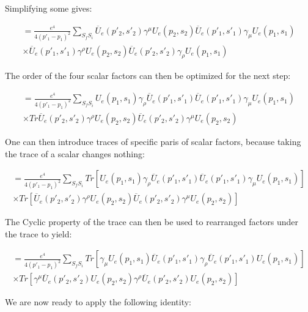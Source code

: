 \documentclass[a4]{article}
\begin{document}
    Simplifying some gives:

    \begin{eqnarray}
        = \frac{e^4}{4 (p'_1 - p_1)^2} \sum_{S_f S_i} \overline{U}_e (p'_2, s'_2) \gamma^{\mu} U_e (p_2, s_2) \overline{U}_e (p'_1, s'_1) \gamma_{\mu} U_e (p_1, s_1) \\
        \times \overline{U}_e (p'_1, s'_1) \gamma^{\rho} U_e (p_2, s_2)  \overline{U}_e (p'_2, s'_2) \gamma_{\rho} U_e (p_1, s_1)
    \end{eqnarray}

    The order of the four scalar factors can then be optimized for the next step:

    \begin{eqnarray}
        = \frac{e^4}{4 (p'_1 - p_1)^2} \sum_{S_f S_i} U_e (p_1, s_1) \gamma_{\rho} \overline{U}_e (p'_1, s'_1) \overline{U}_e (p'_1, s'_1) \gamma_{\mu} U_e (p_1, s_1) \\
        \times Tr \overline{U}_e (p'_2, s'_2) \gamma^{\rho} U_e (p_2, s_2) \overline{U}_e (p'_2, s'_2) \gamma^{\mu} U_e (p_2, s_2)
    \end{eqnarray}

    One can then introduce traces of specific paris of scalar factors, because taking the trace of a scalar changes nothing:

    \begin{eqnarray}
        = \frac{e^4}{4 (p'_1 - p_1)^2} \sum_{S_f S_i} Tr [U_e (p_1, s_1) \gamma_{\rho} \overline{U}_e (p'_1, s'_1) \overline{U}_e (p'_1, s'_1) \gamma_{\mu} U_e (p_1, s_1)] \\
        \times Tr [\overline{U}_e (p'_2, s'_2) \gamma^{\rho} U_e (p_2, s_2) \overline{U}_e (p'_2, s'_2) \gamma^{\mu} U_e (p_2, s_2)]
    \end{eqnarray}

    The Cyclic property of the trace can then be used to rearranged factors under the trace to yield:

    \begin{eqnarray}
        = \frac{e^4}{4 (p'_1 - p_1)^2} \sum_{S_f S_i} Tr [\gamma_{\mu} U_e (p_1, s_1) \overline{U}_e (p'_1, s'_1) \gamma_{\rho} \overline{U}_e (p'_1, s'_1) U_e (p_1, s_1)] \\
        \times Tr [\gamma^{\mu} \overline{U}_e (p'_2, s'_2) U_e (p_2, s_2) \gamma^{\rho} \overline{U}_e (p'_2, s'_2) U_e (p_2, s_2)]
    \end{eqnarray}

    We are now ready to apply the following identity:
\end{document}

